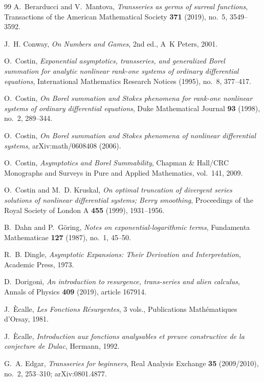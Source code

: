 \documentclass[11pt,openany]{book}
\theoremstyle{definition}
\theoremstyle{plain}
\theoremstyle{remark}
\begin{document}
\begin{thebibliography}{99}
A.~Berarducci and V.~Mantova,
\emph{Transseries as germs of surreal functions},
Transactions of the American Mathematical Society \textbf{371} (2019),
no.~5, 3549--3592.

J.~H. Conway,
\emph{On Numbers and Games}, 2nd ed., A~K Peters, 2001.

O.~Costin,
\emph{Exponential asymptotics, transseries, and generalized Borel summation
for analytic nonlinear rank-one systems of ordinary differential equations},
International Mathematics Research Notices (1995), no.~8, 377--417.

O.~Costin,
\emph{On Borel summation and Stokes phenomena for rank-one nonlinear systems
of ordinary differential equations},
Duke Mathematical Journal \textbf{93} (1998), no.~2, 289--344.

O.~Costin,
\emph{On Borel summation and Stokes phenomena of nonlinear differential
systems}, arXiv:math/0608408 (2006).

O.~Costin,
\emph{Asymptotics and Borel Summability},
Chapman \& Hall/CRC Monographs and Surveys in Pure and Applied Mathematics,
vol.~141, 2009.

O.~Costin and M.~D. Kruskal,
\emph{On optimal truncation of divergent series solutions of nonlinear
differential systems; Berry smoothing},
Proceedings of the Royal Society of London A \textbf{455} (1999),
1931--1956.

B.~Dahn and P.~G\"oring,
\emph{Notes on exponential-logarithmic terms},
Fundamenta Mathematicae \textbf{127} (1987), no.~1, 45--50.

R.~B. Dingle,
\emph{Asymptotic Expansions: Their Derivation and Interpretation},
Academic Press, 1973.

D.~Dorigoni,
\emph{An introduction to resurgence, trans-series and alien calculus},
Annals of Physics \textbf{409} (2019), article 167914.

J.~\`Ecalle,
\emph{Les Fonctions R\'esurgentes}, 3 vols.,
Publications Math\'ematiques d'Orsay, 1981.

J.~\`Ecalle,
\emph{Introduction aux fonctions analysables et preuve constructive de la
conjecture de Dulac}, Hermann, 1992.

G.~A. Edgar,
\emph{Transseries for beginners},
Real Analysis Exchange \textbf{35} (2009/2010), no.~2, 253--310;
arXiv:0801.4877.


\end{thebibliography}
\end{document}
